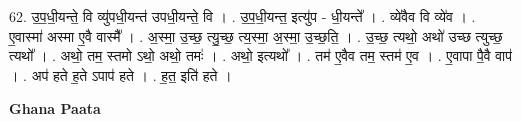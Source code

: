 \documentclass[17pt]{extarticle}
\begin{document}
62. उ॒प॒धी॒यन्ते॒ वि व्यु॑पधी॒यन्त॑ उपधी॒यन्ते॒ वि । . उ॒प॒धी॒यन्त॒ इत्यु॑प - धी॒यन्ते᳚ । . व्ये॑वैव वि व्ये॑व । . ए॒वास्मा॑ अस्मा ए॒वै वास्मै᳚ । . अ॒स्मा॒ उ॒च्छ॒ त्यु॒च्छ॒ त्य॒स्मा॒ अ॒स्मा॒ उ॒च्छ॒ति॒ । . उ॒च्छ॒ त्यथो॒ अथो॑ उच्छ त्युच्छ॒ त्यथो᳚ । . अथो॒ तम॒ स्तमो ऽथो॒ अथो॒ तमः॑ । . अथो॒ इत्यथो᳚ । . तम॑ ए॒वैव तम॒ स्तम॑ ए॒व । . ए॒वापा पै॒वै वाप॑ । . अप॑ हते ह॒ते ऽपाप॑ हते । . ह॒त॒ इति॑ हते । \newline

\textbf{Ghana Paata } \newline
\end{document}
